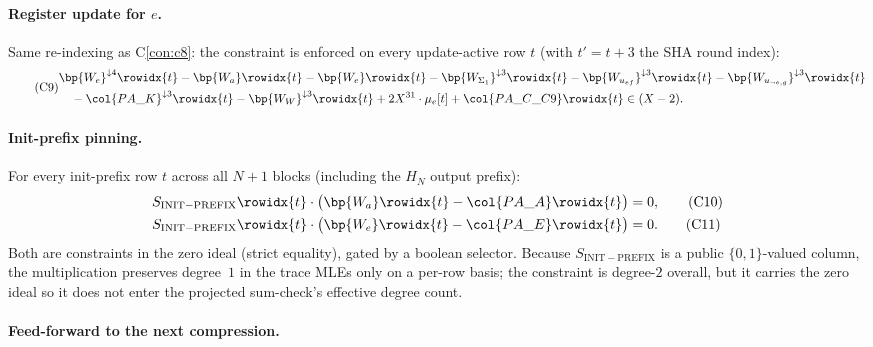 \paragraph{Register update for $e$.}

Same re-indexing as C\ref{con:c8}: the constraint is enforced on
every update-active row $t$ (with $t' = t + 3$ the SHA round
index):
\begin{equation}\tag{C9}\label{con:c9}
\begin{aligned}
&\bp{W_e}^{\downarrow 4}\rowidx{t}
  - \bp{W_a}\rowidx{t}
  - \bp{W_e}\rowidx{t}
  - \bp{W_{\Sigma_1}}^{\downarrow 3}\rowidx{t}
  - \bp{W_{u_{ef}}}^{\downarrow 3}\rowidx{t}
  - \bp{W_{u_{\neg e,g}}}^{\downarrow 3}\rowidx{t} \\
&\quad - \col{PA\_K}^{\downarrow 3}\rowidx{t}
  - \bp{W_W}^{\downarrow 3}\rowidx{t}
  + 2X^{31} \cdot \mu_e[t] + \col{PA\_C\_C9}\rowidx{t} \in (X-2).
\end{aligned}
\end{equation}

\paragraph{Init-prefix pinning.}

For every init-prefix row $t$ across all $N+1$ blocks (including the
$H_N$ output prefix):
\begin{align}
S_{\mathrm{INIT-PREFIX}}\rowidx{t} \cdot \bigl(\bp{W_a}\rowidx{t} - \col{PA\_A}\rowidx{t}\bigr) &= 0, \tag{C10}\label{con:c10}\\
S_{\mathrm{INIT-PREFIX}}\rowidx{t} \cdot \bigl(\bp{W_e}\rowidx{t} - \col{PA\_E}\rowidx{t}\bigr) &= 0. \tag{C11}\label{con:c11}
\end{align}
Both are constraints in the zero ideal (strict equality), gated by a
boolean selector. Because $S_{\mathrm{INIT-PREFIX}}$ is a public
$\{0,1\}$-valued column, the multiplication preserves degree~$1$ in
the trace MLEs only on a per-row basis; the constraint is degree-$2$
overall, but it carries the zero ideal so it does not enter the
projected sum-check's effective degree count.

\paragraph{Feed-forward to the next compression.}

